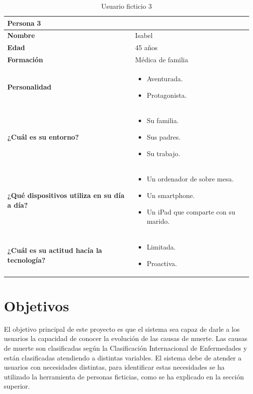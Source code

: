 \begin{table}[H]
	\begin{center}
		\begin{tabular}{| p{} |
                   p{} |}
			\hline
			Persona 3 &  \\ \hline
			\textbf{Nombre} & Isabel \\
			\textbf{Edad} & 45 años \\
			\textbf{Formación} & Médica de familia \\
			\textbf{Personalidad} & \begin{itemize}
                \item Aventurada.
                \item Protagonista.
            \end{itemize} \\
			\textbf{¿Cuál es su entorno?} & \begin{itemize}
                \item Su familia.
                \item Sus padres.
                \item Su trabajo.
            \end{itemize} \\
			\textbf{¿Qué dispositivos utiliza en su día a día?} & \begin{itemize}
                \item Un ordenador de sobre mesa.
                \item Un smartphone.
                \item Un iPad que comparte con su marido.
            \end{itemize} \\
            \textbf{¿Cuál es su actitud hacía la tecnología?} & \begin{itemize}
                \item Limitada.
                \item Proactiva.
            \end{itemize} \\
            \hline
		\end{tabular}
		\caption{Usuario ficticio 3}
	\end{center}
\end{table}


\section{Objetivos}
\label{sec:obj}
El objetivo principal de este proyecto es que el sistema sea capaz de darle a los usuarios la capacidad de conocer
la evolución de las causas de muerte. Las causas de muerte son clasificadas según la Clasificación Internacional
de Enfermedades y están clasificadas atendiendo a distintas variables. El sistema debe de atender a usuarios con
necesidades distintas, para identificar estas necesidades se ha utilizado la herramienta de personas ficticias,
como se ha explicado en la sección superior.